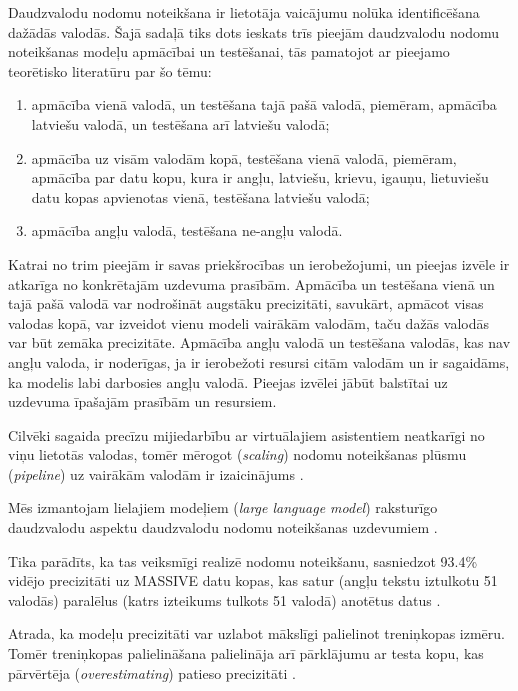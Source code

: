 Daudzvalodu nodomu noteikšana ir lietotāja vaicājumu nolūka identificēšana dažādās valodās. Šajā sadaļā tiks dots ieskats trīs pieejām daudzvalodu nodomu noteikšanas modeļu apmācībai un testēšanai, tās pamatojot ar pieejamo teorētisko literatūru par šo tēmu:
\begin{enumerate}
	\item apmācība vienā valodā, un testēšana tajā pašā valodā, piemēram, apmācība latviešu valodā, un testēšana arī latviešu valodā;
	\item apmācība uz visām valodām kopā, testēšana vienā valodā, piemēram, apmācība par datu kopu, kura ir angļu, latviešu, krievu, igauņu, lietuviešu datu kopas apvienotas vienā, testēšana latviešu valodā;
	\item apmācība angļu valodā, testēšana ne-angļu valodā.
\end{enumerate}

Katrai no trim pieejām ir savas priekšrocības un ierobežojumi, un pieejas izvēle ir atkarīga no konkrētajām uzdevuma prasībām. Apmācība un testēšana vienā un tajā pašā valodā var nodrošināt augstāku precizitāti, savukārt, apmācot visas valodas kopā, var izveidot vienu modeli vairākām valodām, taču dažās valodās var būt zemāka precizitāte. Apmācība angļu valodā un testēšana valodās, kas nav angļu valoda, ir noderīgas, ja ir ierobežoti resursi citām valodām un ir sagaidāms, ka modelis labi darbosies angļu valodā. Pieejas izvēlei jābūt balstītai uz uzdevuma īpašajām prasībām un resursiem.



Cilvēki sagaida precīzu mijiedarbību ar virtuālajiem asistentiem neatkarīgi no viņu lietotās valodas, tomēr mērogot (\textit{scaling}) nodomu noteikšanas plūsmu (\textit{pipeline}) uz vairākām valodām ir izaicinājums \cite{de-bruyn-2022}. 



Mēs izmantojam lielajiem modeļiem (\textit{large language model}) raksturīgo daudzvalodu aspektu daudzvalodu nodomu noteikšanas uzdevumiem \cite{de-bruyn-2022}.




Tika parādīts, ka tas veiksmīgi realizē nodomu noteikšanu, sasniedzot 93.4\% vidējo precizitāti uz MASSIVE datu kopas, kas satur (angļu tekstu iztulkotu 51 valodās) paralēlus (katrs izteikums tulkots 51 valodā) anotētus datus \cite{de-bruyn-2022}.



Atrada, ka modeļu precizitāti var uzlabot mākslīgi palielinot treniņkopas izmēru. Tomēr treniņkopas palielināšana palielināja arī pārklājumu ar testa kopu, kas pārvērtēja (\textit{overestimating}) patieso precizitāti \cite{de-bruyn-2022}.




